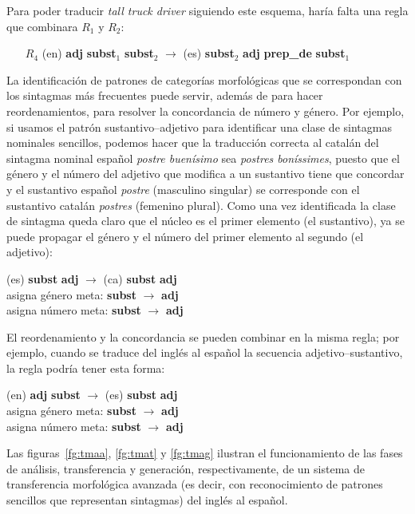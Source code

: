 Para poder traducir \emph{tall truck driver} siguiendo este esquema, haría falta una regla que combinara \(R_1\) y \(R_2\): \begin{itemize} \item[$R_4$] (en) \textbf{adj} \textbf{subst}$_1$ \textbf{subst}$_2$ $\rightarrow$ (es) \textbf{subst}$_2$ \textbf{adj} \textbf{prep\_de} \textbf{subst}$_1$ \end{itemize} 

La identificación de patrones de categorías morfológicas que se correspondan con los sintagmas más frecuentes puede servir, además de para hacer reordenamientos, para resolver la concordancia de número y género. Por ejemplo, si usamos el patrón sustantivo--adjetivo para identificar una clase de sintagmas nominales sencillos, podemos hacer que la traducción correcta al catalán del sintagma nominal español {\em postre buenísimo} sea \emph{postres boníssimes}, puesto que el género y el número del adjetivo que modifica a un sustantivo tiene que concordar y el sustantivo español \emph{postre} (masculino singular) se corresponde con el sustantivo catalán \emph{postres} (femenino plural). Como una vez identificada la clase de sintagma queda claro que el núcleo es el primer elemento (el sustantivo), ya se puede propagar el género y el número del primer elemento al segundo (el adjetivo): \begin{center} (es) \textbf{subst} \textbf{adj} \(\to\) (ca) \textbf{subst} \textbf{adj} \\ asigna género meta: \textbf{subst} \(\to\) \textbf{adj}\\ asigna número meta: \textbf{subst} \(\to\) \textbf{adj} \end{center} 

El reordenamiento y la concordancia se pueden combinar en la misma regla; por ejemplo, cuando se traduce del inglés al español la secuencia adjetivo--sustantivo, la regla podría tener esta forma: \begin{center} (en) \textbf{adj} \textbf{subst} \(\to\) (es) \textbf{subst} \textbf{adj} \\ asigna género meta: \textbf{subst} \(\to\) \textbf{adj}\\ asigna número meta: \textbf{subst} \(\to\) \textbf{adj} \end{center} 

Las figuras~\ref{fg:tmaa}, \ref{fg:tmat} y \ref{fg:tmag} ilustran el funcionamiento de las fases de análisis, transferencia y generación, respectivamente, de un sistema de transferencia morfológica avanzada (es decir, con reconocimiento de patrones sencillos que representan sintagmas) del inglés al español. 

